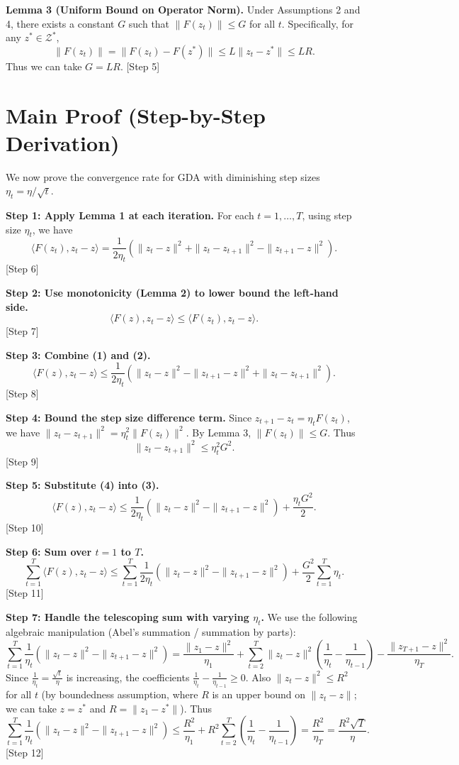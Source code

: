 \documentclass{article}
\begin{document}
\textbf{Lemma 3 (Uniform Bound on Operator Norm).} Under Assumptions 2 and 4, there exists a constant $G$ such that $\|F(z_t)\| \le G$ for all $t$. Specifically, for any $z^* \in \mathcal{Z}^*$,
\[
\|F(z_t)\| = \|F(z_t) - F(z^*)\| \le L \|z_t - z^*\| \le L R.
\]
Thus we can take $G = L R$. [Step 5]

\section*{Main Proof (Step-by-Step Derivation)}

We now prove the convergence rate for GDA with diminishing step sizes $\eta_t = \eta/\sqrt{t}$.

\textbf{Step 1: Apply Lemma 1 at each iteration.}
For each $t = 1, \dots, T$, using step size $\eta_t$, we have
\[
\langle F(z_t), z_t - z \rangle = \frac{1}{2\eta_t} \left( \|z_t - z\|^2 + \|z_t - z_{t+1}\|^2 - \|z_{t+1} - z\|^2 \right). \tag{1}
\]
[Step 6]

\textbf{Step 2: Use monotonicity (Lemma 2) to lower bound the left-hand side.}
\[
\langle F(z), z_t - z \rangle \le \langle F(z_t), z_t - z \rangle. \tag{2}
\]
[Step 7]

\textbf{Step 3: Combine (1) and (2).}
\[
\langle F(z), z_t - z \rangle \le \frac{1}{2\eta_t} \left( \|z_t - z\|^2 - \|z_{t+1} - z\|^2 + \|z_t - z_{t+1}\|^2 \right). \tag{3}
\]
[Step 8]

\textbf{Step 4: Bound the step size difference term.}
Since $z_{t+1} - z_t = \eta_t F(z_t)$, we have $\|z_t - z_{t+1}\|^2 = \eta_t^2 \|F(z_t)\|^2$. By Lemma 3, $\|F(z_t)\| \le G$. Thus
\[
\|z_t - z_{t+1}\|^2 \le \eta_t^2 G^2. \tag{4}
\]
[Step 9]

\textbf{Step 5: Substitute (4) into (3).}
\[
\langle F(z), z_t - z \rangle \le \frac{1}{2\eta_t} \left( \|z_t - z\|^2 - \|z_{t+1} - z\|^2 \right) + \frac{\eta_t G^2}{2}. \tag{5}
\]
[Step 10]

\textbf{Step 6: Sum over $t = 1$ to $T$.}
\[
\sum_{t=1}^T \langle F(z), z_t - z \rangle \le \sum_{t=1}^T \frac{1}{2\eta_t} \left( \|z_t - z\|^2 - \|z_{t+1} - z\|^2 \right) + \frac{G^2}{2} \sum_{t=1}^T \eta_t. \tag{6}
\]
[Step 11]

\textbf{Step 7: Handle the telescoping sum with varying $\eta_t$.}
We use the following algebraic manipulation (Abel's summation / summation by parts):
\[
\sum_{t=1}^T \frac{1}{\eta_t} \left( \|z_t - z\|^2 - \|z_{t+1} - z\|^2 \right)
= \frac{\|z_1 - z\|^2}{\eta_1} + \sum_{t=2}^T \|z_t - z\|^2 \left( \frac{1}{\eta_t} - \frac{1}{\eta_{t-1}} \right) - \frac{\|z_{T+1} - z\|^2}{\eta_T}.
\]
Since $\frac{1}{\eta_t} = \frac{\sqrt{t}}{\eta}$ is increasing, the coefficients $\frac{1}{\eta_t} - \frac{1}{\eta_{t-1}} \ge 0$. Also $\|z_t - z\|^2 \le R^2$ for all $t$ (by boundedness assumption, where $R$ is an upper bound on $\|z_t - z\|$; we can take $z = z^*$ and $R = \|z_1 - z^*\|$). Thus
\[
\sum_{t=1}^T \frac{1}{\eta_t} \left( \|z_t - z\|^2 - \|z_{t+1} - z\|^2 \right)
\le \frac{R^2}{\eta_1} + R^2 \sum_{t=2}^T \left( \frac{1}{\eta_t} - \frac{1}{\eta_{t-1}} \right)
= \frac{R^2}{\eta_T} = \frac{R^2 \sqrt{T}}{\eta}. \tag{7}
\]
[Step 12]
\end{document}
